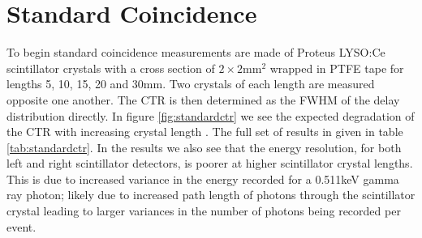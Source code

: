\section{Standard Coincidence}
\label{sec:standardctr}
To begin standard coincidence measurements are made of Proteus LYSO:Ce scintillator crystals with a cross section of $2\times2$mm$^2$ wrapped in PTFE tape for lengths 5, 10, 15, 20 and 30mm. Two crystals of each length are measured opposite one another. The CTR is then determined as the FWHM of the delay distribution directly. In figure \ref{fig:standardctr} we see the expected degradation of the CTR with increasing crystal length \cite{r_Paganoni_Pauwels_et_al__2011}\cite{Wiener_Kaul_Surti_Karp_2010}\cite{Choong_2009}\cite{Gola_Piemonte_Tarolli_2013}\cite{o_Pro_Serra_Tarolli_Zorzi_2011}. The full set of results in given in table \ref{tab:standardctr}. In the results we also see that the energy resolution, for both left and right scintillator detectors, is poorer at higher scintillator crystal lengths. This is due to increased variance in the energy recorded for a 0.511keV gamma ray photon; likely due to increased path length of photons through the scintillator crystal leading to larger variances in the number of photons being recorded per event.